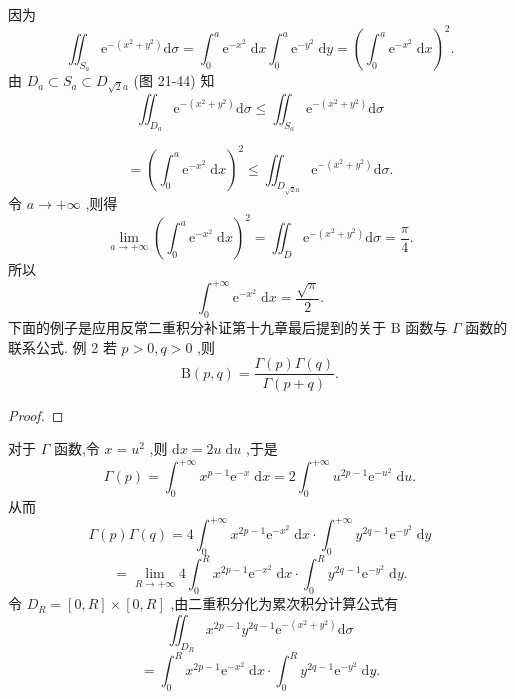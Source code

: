 因为
\[
{\iint }_{{S}_{a}}{\mathrm{e}}^{-\left( {{x}^{2} + {y}^{2}}\right) }\mathrm{d}\sigma  = {\int }_{0}^{a}{\mathrm{e}}^{-{x}^{2}}\mathrm{\;d}x{\int }_{0}^{a}{\mathrm{e}}^{-{y}^{2}}\mathrm{\;d}y = {\left( {\int }_{0}^{a}{\mathrm{e}}^{-{x}^{2}}\mathrm{\;d}x\right) }^{2}.
\]
由 \({D}_{a} \subset  {S}_{a} \subset  {D}_{\sqrt{2}a}\) (图 21-44) 知
\[
{\iint }_{{D}_{a}}{\mathrm{e}}^{-\left( {{x}^{2} + {y}^{2}}\right) }\mathrm{d}\sigma  \leq  {\iint }_{{S}_{a}}{\mathrm{e}}^{-\left( {{x}^{2} + {y}^{2}}\right) }\mathrm{d}\sigma
\]

\[
= {\left( {\int }_{0}^{a}{\mathrm{e}}^{-{x}^{2}}\mathrm{\;d}x\right) }^{2} \leq  {\iint }_{{D}_{\sqrt{2}a}}{\mathrm{e}}^{-\left( {{x}^{2} + {y}^{2}}\right) }\mathrm{d}\sigma .
\]
令 \(a \rightarrow   + \infty\) ,则得
\[
\mathop{\lim }\limits_{{a \rightarrow   + \infty }}{\left( {\int }_{0}^{a}{\mathrm{e}}^{-{x}^{2}}\mathrm{\;d}x\right) }^{2} = {\iint }_{D}{\mathrm{e}}^{-\left( {{x}^{2} + {y}^{2}}\right) }\mathrm{d}\sigma  = \frac{\pi }{4}.
\]
所以
\[
{\int }_{0}^{+\infty }{\mathrm{e}}^{-{x}^{2}}\mathrm{\;d}x = \frac{\sqrt{\pi }}{2}.
\]
下面的例子是应用反常二重积分补证第十九章最后提到的关于 \(\mathrm{B}\) 函数与 \(\Gamma\) 函数的联系公式. 例 2 若 \(p > 0,q > 0\) ,则
\[
\mathrm{B}\left( {p,q}\right)  = \frac{\Gamma \left( p\right) \Gamma \left( q\right) }{\Gamma \left( {p + q}\right) }. \tag{3}
\]
\begin{proof}

\end{proof}
对于 \(\Gamma\) 函数,令 \(x = {u}^{2}\) ,则 \(\mathrm{d}x = {2u}\mathrm{\;d}u\) ,于是
\[
\Gamma \left( p\right)  = {\int }_{0}^{+\infty }{x}^{p - 1}{\mathrm{e}}^{-x}\mathrm{\;d}x = 2{\int }_{0}^{+\infty }{u}^{{2p} - 1}{\mathrm{e}}^{-{u}^{2}}\mathrm{\;d}u.
\]
从而
\[
\Gamma \left( p\right) \Gamma \left( q\right)  = 4{\int }_{0}^{+\infty }{x}^{{2p} - 1}{\mathrm{e}}^{-{x}^{2}}\mathrm{\;d}x \cdot  {\int }_{0}^{+\infty }{y}^{{2q} - 1}{\mathrm{e}}^{-{y}^{2}}\mathrm{\;d}y
\]
\[
= \mathop{\lim }\limits_{{R \rightarrow   + \infty }}4{\int }_{0}^{R}{x}^{{2p} - 1}{\mathrm{e}}^{-{x}^{2}}\mathrm{\;d}x \cdot  {\int }_{0}^{R}{y}^{{2q} - 1}{\mathrm{e}}^{-{y}^{2}}\mathrm{\;d}y.
\]
令 \({D}_{R} = \left\lbrack  {0,R}\right\rbrack   \times  \left\lbrack  {0,R}\right\rbrack\) ,由二重积分化为累次积分计算公式有
\[
{\iint }_{{D}_{R}}{x}^{{2p} - 1}{y}^{{2q} - 1}{\mathrm{e}}^{-\left( {{x}^{2} + {y}^{2}}\right) }\mathrm{d}\sigma
\]
\[
= {\int }_{0}^{R}{x}^{{2p} - 1}{\mathrm{e}}^{-{x}^{2}}\mathrm{\;d}x \cdot  {\int }_{0}^{R}{y}^{{2q} - 1}{\mathrm{e}}^{-{y}^{2}}\mathrm{\;d}y.
\]
